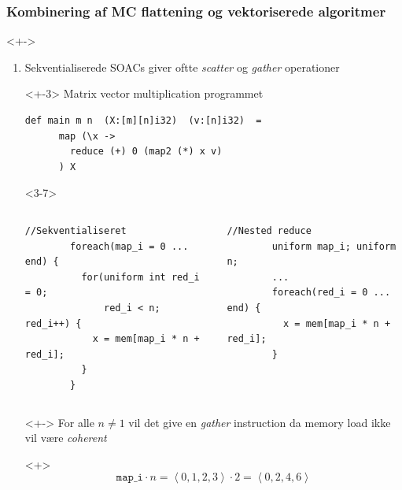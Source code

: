 \documentclass[t]{beamer}
\begin{document}
\begin{frame}[fragile]
  \frametitle{Kombinering af MC flattening og vektoriserede algoritmer}
  <+->
  \begin{enumerate}
    \item<+-> Sekventialiserede SOACs giver oftte \textit{scatter} og \textit{gather} operationer\\
      \begin{onlyenv}<+-3>
        Matrix vector multiplication programmet
        \begin{lstlisting}[language=futhark]
    def main m n  (X:[m][n]i32)  (v:[n]i32)  =
      map (\x ->
        reduce (+) 0 (map2 (*) x v)
      ) X
\end{lstlisting}
      \end{onlyenv}
      \begin{onlyenv}<3-7>
      \begin{columns}
        \begin{column}{0.49\textwidth}
        \begin{lstlisting}[language=ispc, xleftmargin=-15mm, breaklines=false]
        //Sekventialiseret
        foreach(map_i = 0 ... end) {
          for(uniform int red_i = 0;
              red_i < n; red_i++) {
            x = mem[map_i * n + red_i];
          }
        }
\end{lstlisting}
        \end{column}
        \begin{column}{0.49\textwidth}
        \begin{lstlisting}[language=ispc, xleftmargin=-15mm, breaklines=false]
        //Nested reduce
        uniform map_i; uniform n;
        ...
        foreach(red_i = 0 ... end) {
          x = mem[map_i * n + red_i];
        }
\end{lstlisting}
          \end{column}
        \end{columns}
      \end{onlyenv}
  \begin{onlyenv}<+->
    For alle $n \neq 1$ vil det give en \textit{gather} instruction da memory load ikke vil være \textit{coherent}
  \end{onlyenv}
  \begin{onlyenv}<+>
    $$
    \texttt{map\_i} \cdot n =\left<0, 1, 2, 3 \right> \cdot 2 = \left<0,2,4,6\right>
    $$
  \end{onlyenv}


\end{enumerate}
\end{frame}
\end{document}
